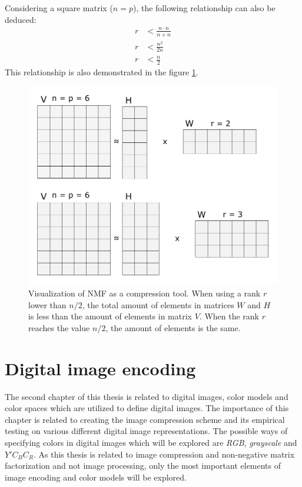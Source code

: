 \documentclass[thesis=M,english]{FITthesis}[2012/10/20]
\begin{document}
Considering a square matrix ($n = p$), the following relationship can also
be deduced:
\begin{align*}
  r &< \frac{n \cdot n}{n + n}\\
  r &< \frac{n^{2}}{2n}\\
  r &< \frac{n}{2}
\end{align*}
This relationship is also demonstrated in the figure \ref{fig:minrank}.

\begin{figure}[h]
  \centering
  \includegraphics[scale=0.7]{imgs/minrank}
  \caption[Visualization of NMF as a compression tool]{Visualization of NMF as a compression tool.
           When using a rank $r$ lower than $n/2$, the total amount of elements in matrices
           $W$ and $H$ is less than the amount of elements in matrix $V$. When the rank
           $r$ reaches the value $n/2$, the amount of elements is the same.}
  \label{fig:minrank}
\end{figure}



\chapter{Digital image encoding}
\label{ch:image-encoding}
The second chapter of this thesis is related to digital images, color models
and color spaces which are utilized to define digital images. The importance of this chapter is related to
creating the image compression scheme and its empirical testing on
various different digital image representations. The possible ways of
specifying colors in digital images which will be explored are \emph{RGB},
\emph{grayscale} and $Y'C_BC_R$. As this thesis is related to image
compression and non-negative matrix factorization and not image processing,
only the most important elements of image encoding and color models will be explored.
\end{document}
